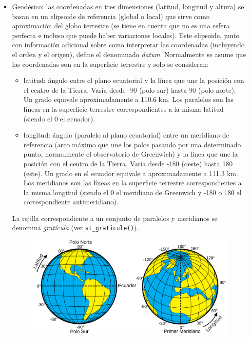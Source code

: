 \documentclass[
  spanish,
]{book}
\providecommand{\tightlist}{%
  \setlength{\itemsep}{0pt}\setlength{\parskip}{0pt}}
\theoremstyle{break}
\theoremstyle{definition}
\theoremstyle{definition}
\theoremstyle{definition}
\theoremstyle{definition}
\theoremstyle{remark}
\begin{document}
\begin{itemize}
\item
  Geodésico: las coordenadas en tres dimensiones (latitud, longitud y altura) se basan en un elipsoide de referencia (global o local) que sirve como aproximación del globo terrestre (se tiene en cuenta que no es una esfera perfecta e incluso que puede haber variaciones locales). Este elipsoide, junto con información adicional sobre como interpretar las coordenadas (incluyendo el orden y el origen), define el denominado \emph{datum}. Normalmente se asume que las coordenadas son en la superficie terrestre y solo se consideran:

  \begin{itemize}
  \tightlist
  \item
    latitud: ángulo entre el plano ecuatorial y la línea que une la posición con el centro de la Tierra. Varía desde -90 (polo sur) hasta 90 (polo norte). Un grado equivale aproximadamente a 110.6 km. Los paralelos son las líneas en la superficie terrestre correspondientes a la misma latitud (siendo el 0 el ecuador).
  \item
    longitud: ángulo (paralelo al plano ecuatorial) entre un meridiano de referencia (arco máximo que une los polos pasando por una determinado punto, normalmente el observatorio de Greenwich) y la línea que une la posición con el centro de la Tierra. Varía desde -180 (oeste) hasta 180 (este). Un grado en el ecuador equivale a aproximadamente a 111.3 km. Los meridianos son las líneas en la superficie terrestre correspondientes a la misma longitud (siendo el 0 el meridiano de Greenwich y -180 o 180 el correspondiente antimeridiano).
  \end{itemize}

  La rejilla correspondiente a un conjunto de paralelos y meridianos se denomina \emph{gratícula} (ver \texttt{st\_graticule()}).

  \begin{figure}[!htb]

    {\centering \includegraphics[width=0.85\linewidth]{images/Latitud_y_Longitud} 

}
\end{figure}
\end{itemize}
\end{document}
